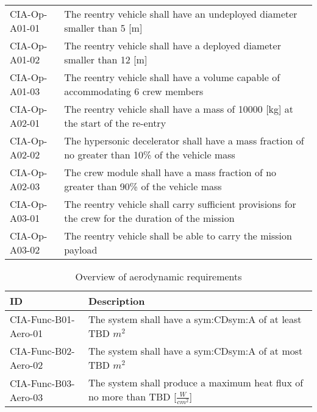 \begin{table}[H]
\begin{tabular}{|p{}|p{}|}
& \\ \hline
	CIA-Op-A01-01 & The reentry vehicle shall have an undeployed diameter smaller than 5 [m]                         				            \\ \hline
	CIA-Op-A01-02 & The reentry vehicle shall have a deployed diameter smaller than 12 [m]                         				            \\ \hline
	CIA-Op-A01-03 & The reentry vehicle shall have a volume capable of accommodating 6 crew members                        				            \\ \hline
	CIA-Op-A02-01 & The reentry vehicle shall have a mass of 10000 [kg] at the start of the re-entry                       				            \\ \hline
	CIA-Op-A02-02 & The hypersonic decelerator shall have a mass fraction of no greater than 10\% of the vehicle mass  \\ \hline
	CIA-Op-A02-03 & The crew module shall have a mass fraction of no greater than 90\% of the vehicle mass \\ \hline
	CIA-Op-A03-01 & The reentry vehicle shall carry sufficient provisions for the crew for the duration of the mission \\ \hline
	CIA-Op-A03-02 & The reentry vehicle shall be able to carry the mission payload								\\ \hline	
    \end{tabular}
\end{table}


\begin{table}[h]
	\caption*{Overview of aerodynamic requirements}
	\label{tab:aeroreqs}
	\begin{tabular}{|p{}|p{}|}
		\hline
		ID & Description \\
		\hline \hline
		CIA-Func-B01-Aero-01 & The system shall have a \gls{sym:CD}\gls{sym:A} of at least TBD $m^{2}$ \\ \hline
		CIA-Func-B02-Aero-02 & The system shall have a \gls{sym:CD}\gls{sym:A} of at most TBD $m^{2}$ \\ \hline
		CIA-Func-B03-Aero-03 & The system shall produce a maximum heat flux of no more than TBD [$\frac{W}{cm^{2}}$] \\ \hline
	\end{tabular}
\end{table}

